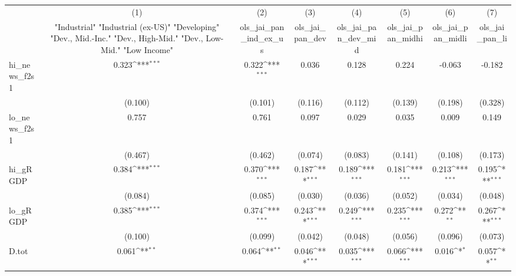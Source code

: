 {
\def\sym#1{\ifmmode^{#1}\else\(^{#1}\)\fi}
\begin{tabular}{l*{7}{c}}
\toprule
            &\multicolumn{1}{c}{(1)}&\multicolumn{1}{c}{(2)}&\multicolumn{1}{c}{(3)}&\multicolumn{1}{c}{(4)}&\multicolumn{1}{c}{(5)}&\multicolumn{1}{c}{(6)}&\multicolumn{1}{c}{(7)}\\
            &\multicolumn{1}{c}{ "Industrial" "Industrial (ex-US)" "Developing" "Dev., Mid.-Inc." "Dev., High-Mid."  "Dev., Low-Mid." "Low Income" }&\multicolumn{1}{c}{ols\_jai\_pan\_ind\_ex\_us}&\multicolumn{1}{c}{ols\_jai\_pan\_dev}&\multicolumn{1}{c}{ols\_jai\_pan\_dev\_mid}&\multicolumn{1}{c}{ols\_jai\_pan\_midhi}&\multicolumn{1}{c}{ols\_jai\_pan\_midli}&\multicolumn{1}{c}{ols\_jai\_pan\_li}\\
\midrule
hi\_news\_f2s1&       0.323\sym{***}&       0.322\sym{***}&       0.036         &       0.128         &       0.224         &      -0.063         &      -0.182         \\
            &     (0.100)         &     (0.101)         &     (0.116)         &     (0.112)         &     (0.139)         &     (0.198)         &     (0.328)         \\
\addlinespace
lo\_news\_f2s1&       0.757         &       0.761         &       0.097         &       0.029         &       0.035         &       0.009         &       0.149         \\
            &     (0.467)         &     (0.462)         &     (0.074)         &     (0.083)         &     (0.141)         &     (0.108)         &     (0.173)         \\
\addlinespace
hi\_gRGDP    &       0.384\sym{***}&       0.370\sym{***}&       0.187\sym{***}&       0.189\sym{***}&       0.181\sym{***}&       0.213\sym{***}&       0.195\sym{***}\\
            &     (0.084)         &     (0.085)         &     (0.030)         &     (0.036)         &     (0.052)         &     (0.034)         &     (0.048)         \\
\addlinespace
lo\_gRGDP    &       0.385\sym{***}&       0.374\sym{***}&       0.243\sym{***}&       0.249\sym{***}&       0.235\sym{***}&       0.272\sym{**} &       0.267\sym{***}\\
            &     (0.100)         &     (0.099)         &     (0.042)         &     (0.048)         &     (0.056)         &     (0.096)         &     (0.073)         \\
\addlinespace
D.tot       &       0.061\sym{**} &       0.064\sym{**} &       0.046\sym{***}&       0.035\sym{***}&       0.066\sym{***}&       0.016\sym{*}  &       0.057\sym{**} \\

\end{tabular}}
